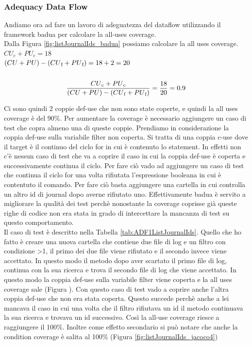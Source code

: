 \documentclass[12pt, a4paper]{article}
\begin{document}
 \subsubsection{Adequacy Data Flow}

 Andiamo ora ad fare un lavoro di adeguatezza del dataflow utilizzando il framework badua per calcolare la all-uses coverage. \\
Dalla Figura \ref{fig:listJournalIds_badua} possiamo calcolare la all uses coverage. \\
\(CU_c + PU_c = 18\) \\
\( (CU + PU) - (CU\textsubscript{f} + PU\textsubscript{f}) = 18 + 2 = 20\) \\ \\
\[\frac{{CU\textsubscript{c} + PU\textsubscript{c}}}{{(CU + PU) - (CU\textsubscript{f} + PU\textsubscript{f})}} = \frac{{18}}{{20}} = 0.9\]

Ci sono quindi 2 coppie def-use che non sono state coperte, e quindi la all uses coverage è del 90\%.
Per aumentare la coverage è necessario aggiungere un caso di test che copra almeno una di queste coppie.
Prendiamo in considerazione la coppia def-use sulla variabile filter non coperta. Si tratta di una coppia c-use 
dove il target è il continuo del ciclo for in cui è contenuto lo statement. In effetti non c'è nessun caso di test
che va a coprire il caso in cui la coppia def-use è coperta e successivamente continua il ciclo.
Per fare ciò vado ad aggiungere un caso di test che continua il ciclo for una volta rifiutata 
l'espressione booleana in cui è contentuto il comando. Per fare ciò basta aggiungere una cartella in cui controlla
un altro id di journal dopo averne rifiutato uno. Effettivamente badua è servito a migliorare la qualità dei 
test perchè nonostante la coverage
coprisse già queste righe di codice non era stata in grado di intercettare la mancanza
di test su questo comportamento. \\
Il caso di test è descritto nella Tabella \ref{tab:ADF1ListJournalIds}. Quello che ho fatto è creare una nuova
cartella che contiene due file di log e un filtro con condizione \textgreater1, il primo dei due file viene rifiutato 
e il secondo invece viene accettato. In questo modo il metodo dopo aver scartato il primo file di log, continua
con la sua ricerca e trova il secondo file di log che viene accettato. In questo modo la coppia
def-use sulla variabile filter viene coperta e la all uses coverage sale (Figura ).
Con questo caso di test vado a coprire anche l'altra coppia def-use che non era stata coperta.
Questo succede perchè anche a lei mancava il caso in cui una volta che il filtro rifiutava un id il
metodo continuava la sua ricerca e trovava un id successivo.
Così la all-use coverage riesce a raggiungere il 100\%. Inoltre come effetto secondario si può notare che anche
la condition coverage è salita al 100\% (Figura \ref{fig:listJournalIds_jacoco4})
\end{document}
